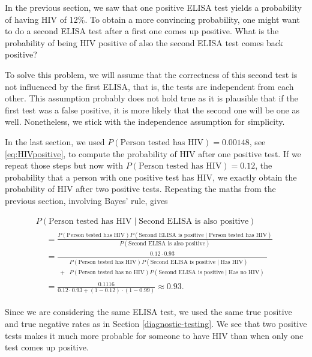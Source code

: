 \documentclass[]{book}
\theoremstyle{definition}
\theoremstyle{definition}
\theoremstyle{remark}
\begin{document}
In the previous section, we saw that one positive ELISA test yields a
probability of having HIV of 12\%. To obtain a more convincing
probability, one might want to do a second ELISA test after a first one
comes up positive. What is the probability of being HIV positive of also
the second ELISA test comes back positive?

To solve this problem, we will assume that the correctness of this
second test is not influenced by the first ELISA, that is, the tests are
independent from each other. This assumption probably does not hold true
as it is plausible that if the first test was a false positive, it is
more likely that the second one will be one as well. Nonetheless, we
stick with the independence assumption for simplicity.

In the last section, we used
\(P(\text{Person tested has HIV}) = 0.00148\), see \eqref{eq:HIVpositive},
to compute the probability of HIV after one positive test. If we repeat
those steps but now with \(P(\text{Person tested has HIV}) = 0.12\), the
probability that a person with one positive test has HIV, we exactly
obtain the probability of HIV after two positive tests. Repeating the
maths from the previous section, involving Bayes' rule, gives

\begin{multline*}
  P(\text{Person tested has HIV} \mid \text{Second ELISA is also positive}) \\
  \begin{split}
  &= \frac{P(\text{Person tested has HIV}) P(\text{Second ELISA is positive} \mid \text{Person tested has HIV})}{P(\text{Second ELISA is also positive})} \\
  &= \frac{0.12 \cdot 0.93}{
  \begin{split}
  &P(\text{Person tested has HIV}) P(\text{Second ELISA is positive} \mid \text{Has HIV}) \\
  + &P(\text{Person tested has no HIV}) P(\text{Second ELISA is positive} \mid \text{Has no HIV})
  \end{split}
  } \\
  &= \frac{0.1116}{0.12 \cdot 0.93 + (1 - 0.12)\cdot (1 - 0.99)} \approx 0.93.
  \end{split}
  \label{eq:Bayes-updating}
\end{multline*}

Since we are considering the same ELISA test, we used the same true
positive and true negative rates as in Section \ref{diagnostic-testing}.
We see that two positive tests makes it much more probable for someone
to have HIV than when only one test comes up positive.
\end{document}
